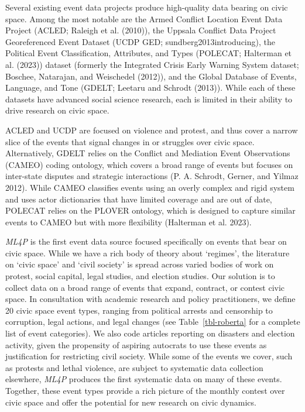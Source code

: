 \documentclass[
  letterpaper,
  DIV=11,
  numbers=noendperiod]{scrartcl}
\begin{document}
Several existing event data projects produce high-quality data bearing
on civic space. Among the most notable are the Armed Conflict Location
Event Data Project (ACLED; Raleigh et al. (2010)), the Uppsala Conflict
Data Project Georeferenced Event Dataset (UCDP GED;
sundberg2013introducing), the Political Event Classification,
Attributes, and Types (POLECAT; Halterman et al. (2023)) dataset
(formerly the Integrated Crisis Early Warning System dataset; Boschee,
Natarajan, and Weischedel (2012)), and the Global Database of Events,
Language, and Tone (GDELT; Leetaru and Schrodt (2013)). While each of
these datasets have advanced social science research, each is limited in
their ability to drive research on civic space.

ACLED and UCDP are focused on violence and protest, and thus cover a
narrow slice of the events that signal changes in or struggles over
civic space. Alternatively, GDELT relies on the Conflict and Mediation
Event Observations (CAMEO) coding ontology, which covers a broad range
of events but focuses on inter-state disputes and strategic interactions
(P. A. Schrodt, Gerner, and Yilmaz 2012). While CAMEO classifies events
using an overly complex and rigid system and uses actor dictionaries
that have limited coverage and are out of date, POLECAT relies on the
PLOVER ontology, which is designed to capture similar events to CAMEO
but with more flexibility (Halterman et al. 2023).

\emph{ML4P} is the first event data source focused specifically on
events that bear on civic space. While we have a rich body of theory
about `regimes', the literature on `civic space' and `civil society' is
spread across varied bodies of work on protest, social capital, legal
studies, and election studies. Our solution is to collect data on a
broad range of events that expand, contract, or contest civic space. In
consultation with academic research and policy practitioners, we define
20 civic space event types, ranging from political arrests and
censorship to corruption, legal actions, and legal changes (see
Table~\ref{tbl-roberta} for a complete list of event categories). We
also code articles reporting on disasters and election activity, given
the propensity of aspiring autocrats to use these events as
justification for restricting civil society. While some of the events we
cover, such as protests and lethal violence, are subject to systematic
data collection elsewhere, \emph{ML4P} produces the first systematic
data on many of these events. Together, these event types provide a rich
picture of the monthly contest over civic space and offer the potential
for new research on civic dynamics.
\end{document}

